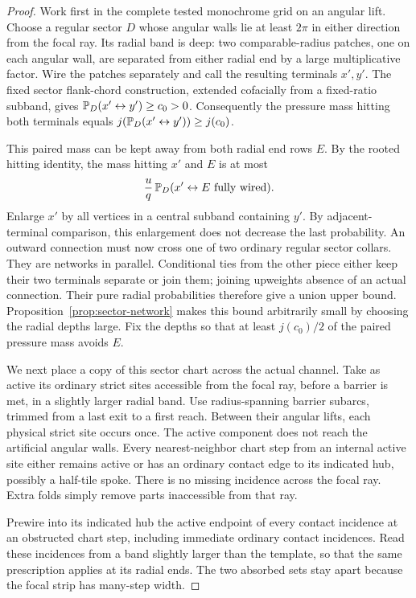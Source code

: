 \begin{proof}
Work first in the complete tested monochrome grid on an angular lift.
Choose a regular sector \(D\) whose angular walls lie at least \(2\pi\)
in either direction from the focal ray.  Its radial band is deep:
two comparable-radius patches, one on each angular wall, are separated
from either radial end by a large multiplicative factor.  Wire the
patches separately and call the resulting terminals \(x',y'\).
The fixed sector flank-chord construction, extended cofacially from
a fixed-ratio subband, gives
\(\mathbb P_D(x'\leftrightarrow y')\ge c_0>0\).  Consequently the pressure
mass hitting both terminals equals
\(j(\mathbb P_D(x'\leftrightarrow y'))\ge j(c_0)\).

This paired mass can be kept away from both radial end rows \(E\).
By the rooted hitting identity, the mass hitting \(x'\) and \(E\)
is at most
\[
 \frac{u}{q}\,
 \mathbb P_D(x'\leftrightarrow E\text{ fully wired}).
\]
Enlarge \(x'\) by all vertices in a central subband containing \(y'\).
By adjacent-terminal comparison, this enlargement does not decrease
the last probability.
An outward connection must now cross one of two ordinary regular
sector collars.  They are networks in parallel.  Conditional ties
from the other piece either keep their two terminals separate or
join them; joining upweights absence of an actual connection.
Their pure radial probabilities therefore give a union upper bound.
Proposition~\ref{prop:sector-network} makes this bound arbitrarily
small by choosing the radial depths large.  Fix the depths so that
at least \(j(c_0)/2\) of the paired pressure mass avoids \(E\).

We next place a copy of this sector chart across the actual channel.
Take as active its ordinary strict sites accessible from the focal
ray, before a barrier is met, in a slightly larger radial band.
Use radius-spanning barrier subarcs, trimmed from a last exit to a
first reach.  Between their angular lifts, each physical strict
site occurs once.  The active component does not reach the artificial
angular walls.  Every nearest-neighbor chart step from an internal
active site either remains active or has an ordinary contact edge
to its indicated hub, possibly a half-tile spoke.  There is no
missing incidence across the focal ray.  Extra folds simply remove
parts inaccessible from that ray.

Prewire into its indicated hub the active endpoint of every contact
incidence at an obstructed chart step, including immediate ordinary
contact incidences.  Read these incidences from a band slightly
larger than the template, so that the same prescription applies at
its radial ends.  The two absorbed sets stay apart because the
focal strip has many-step width.


\end{proof}
